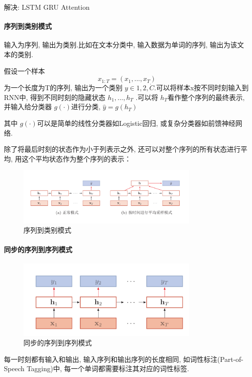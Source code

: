 \documentclass[a4paper]{article}
\theoremstyle{definition}
\numberwithin{equation}{section}
\begin{document}
解决: LSTM GRU Attention


\paragraph{序列到类别模式}

输入为序列, 输出为类别.比如在文本分类中, 输入数据为单词的序列, 输出为该文本的类别.

假设一个样本$$ x_{1:T}=(x_1, ...,  x_T)$$ 为一个长度为T的序列, 输出为一个类别 $y \in {1,  2,  \dot C}$.可以将样本x按不同时刻输入到RNN中, 得到不同时刻的隐藏状态 $h_1,  \dots,  h_T$ .可以将 $h_T$看作整个序列的最终表示, 并输入给分类器 $g(\cdot)$进行分类,  $\hat{y}=g(h_T)$

其中 $g(\cdot)$可以是简单的线性分类器如Logistic回归, 或复杂分类器如前馈神经网络.

除了将最后时刻的状态作为小于列表示之外, 还可以对整个序列的所有状态进行平均, 用这个平均状态作为整个序列的表示：
\begin{figure}[!htb]
    \center
\includegraphics[width=0.8\textwidth]{RNN_model1.png}
\caption{序列到类别模式}
\end{figure}


\paragraph{同步的序列到序列模式}

\begin{figure}[!htb]
    \center
\includegraphics[width=0.8\textwidth]{RNN_model2.png}
\caption{同步的序列到序列模式}
\end{figure}
每一时刻都有输入和输出, 输入序列和输出序列的长度相同, 如词性标注(Part-of-Speech Tagging)中, 每一个单词都需要标注其对应的词性标签.
\end{document}
